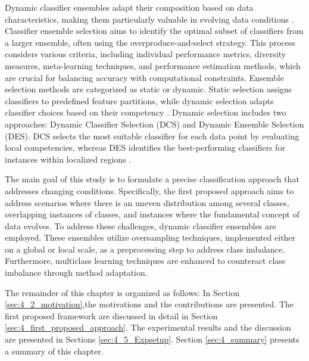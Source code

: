   Dynamic classifier ensembles adapt their composition based on data characteristics, making them particularly valuable in evolving data conditions \cite{woloszynski2011probabilistic}. Classifier ensemble selection aims to identify the optimal subset of classifiers from a larger ensemble, often using the overproduce-and-select strategy. This process considers various criteria, including individual performance metrics, diversity measures, meta-learning techniques, and performance estimation methods, which are crucial for balancing accuracy with computational constraints. Ensemble selection methods are categorized as static or dynamic. Static selection assigns classifiers to predefined feature partitions, while dynamic selection adapts classifier choices based on their competency \cite{lysiak2014optimal}. Dynamic selection includes two approaches: Dynamic Classifier Selection (DCS) and Dynamic Ensemble Selection (DES). DCS selects the most suitable classifier for each data point by evaluating local competencies, whereas DES identifies the best-performing classifiers for instances within localized regions \cite{cruz2017meta, widmer1996learning, lu2016concept}.

  The main goal of this study is to formulate a precise classification approach that addresses changing conditions. Specifically, the
  first proposed approach aims to address scenarios where there is an uneven distribution among several classes, overlapping instances of
  classes, and instances where the fundamental concept of data evolves. To address these challenges, dynamic classifier
  ensembles are employed. These ensembles utilize oversampling techniques, implemented either on a global or local scale, as a preprocessing step to
  address class imbalance. Furthermore, multiclass learning techniques are enhanced to counteract class imbalance through method
  adaptation. 
  
  The remainder of this chapter is organized as follows: In Section \ref{sec:4_2_motivation},the motivations and the contributions are presented. The first proposed framework are discussed in detail in Section \ref{sec:4_first_proposed_approach}. The  experimental results and the discussion are presented in Sections \ref{sec:4_5_Expsetup}. Section \ref{sec:4_summary} presents a summary of this chapter.
  
  
